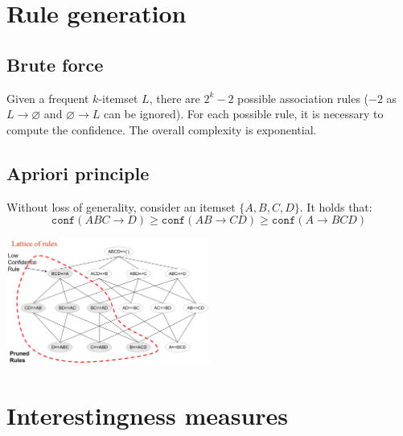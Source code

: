 \section{Rule generation}

\subsection{Brute force}
Given a frequent $k$-itemset $L$, there are $2^k-2$ possible association rules ($-2$ as $L \rightarrow \varnothing$ and $\varnothing \rightarrow L$ can be ignored).
For each possible rule, it is necessary to compute the confidence. The overall complexity is exponential.

\subsection{Apriori principle}

\begin{theorem} 
    Without loss of generality, consider an itemset $\{ A, B, C, D \}$.
    It holds that:
    \[ \texttt{conf}(ABC \rightarrow D) \geq \texttt{conf}(AB \rightarrow CD) \geq \texttt{conf}(A \rightarrow BCD) \]
\end{theorem}

\begin{example} \phantom{}
    \begin{center}
        \includegraphics[width=0.5\textwidth]{img/rules_apriori.png}
    \end{center}
\end{example}



\section{Interestingness measures}


